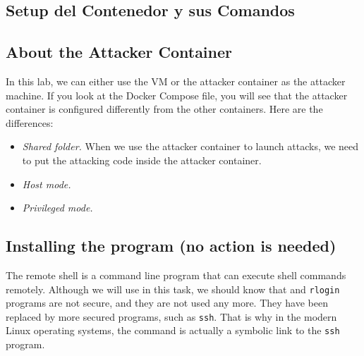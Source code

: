 \subsection{Setup del Contenedor y sus Comandos}





\subsection{About the Attacker Container}

In this lab, we can either use the VM or the attacker container
as the attacker machine. If you look at the Docker Compose file, you will
see that the attacker container is configured differently from the other
containers. Here are the differences:

\begin{itemize}
\item \textit{Shared folder.} When we use the attacker container
to launch attacks, we need to put the attacking code inside
the attacker container.


\item \textit{Host mode.}



\item \textit{Privileged mode.}


\end{itemize}


\subsection{Installing the \rsh program (no action is needed)}

The remote shell \rsh is a command line program that can execute shell commands
remotely. Although we will use \rsh in this task, we should know that 
\rsh and \texttt{rlogin} programs are not secure, and they 
are not used any more. They have been replaced by
more secured programs, such as \texttt{ssh}.   
That is why in the modern Linux operating systems, the \rsh command 
is actually a symbolic link to the \texttt{ssh} program. 

